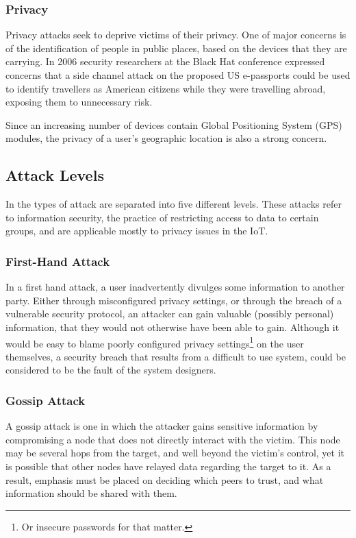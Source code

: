 \documentclass[10pt,journal,compsoc]{IEEEtran}
\begin{document}
\subsubsection{Privacy}
Privacy attacks seek to deprive victims of their privacy. One of major concerns
is of the identification of people in public places, based on the devices that
they are carrying. In 2006 security researchers at the Black Hat conference
\cite{Flexilis2006} expressed concerns that a side channel attack on the
proposed US e-passports could be used to identify travellers as American
citizens while they were travelling abroad, exposing them to unnecessary risk.

Since an increasing number of devices contain Global Positioning System (GPS)
modules, the privacy of a user's geographic location is also a strong concern.

\subsection{Attack Levels}
In \cite{Elkhodr2013} the types of attack are separated into five different
levels. These attacks refer to information security, the practice of
restricting access to data to certain groups, and are applicable mostly to
privacy issues in the IoT.

\subsubsection{First-Hand Attack}
In a first hand attack, a user inadvertently divulges some information to
another party. Either through misconfigured privacy settings, or through the
breach of a vulnerable security protocol, an attacker can gain valuable
(possibly personal) information, that they would not otherwise have been able
to gain. Although it would be easy to blame poorly configured privacy
settings\footnote{Or insecure passwords for that matter.} on the user
themselves, a security breach that results from a difficult to use system,
could be considered to be the fault of the system designers. 

\subsubsection{Gossip Attack}
A gossip attack is one in which the attacker gains sensitive information by
compromising a node that does not directly interact with the victim. This node
may be several hops from the target, and well beyond the victim's control, yet
it is possible that other nodes have relayed data regarding the target to it.
As a result, emphasis must be placed on deciding which peers to trust, and what
information should be shared with them.
\end{document}
